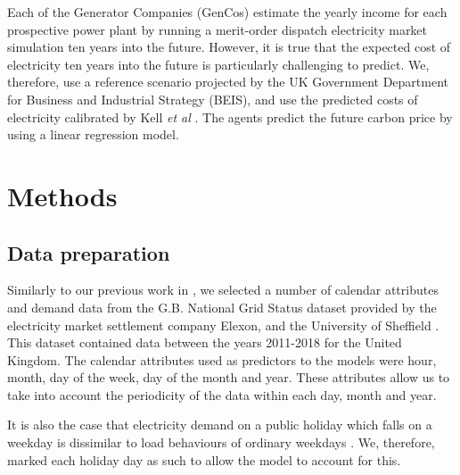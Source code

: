 \documentclass[final,3p,times,twocolumn,numbers]{elsarticle}
\begin{document}
Each of the Generator Companies (GenCos) estimate the yearly income for each prospective power plant by running a merit-order dispatch electricity market simulation ten years into the future. However, it is true that the expected cost of electricity ten years into the future is particularly challenging to predict. We, therefore, use a reference scenario projected by the UK Government Department for Business and Industrial Strategy (BEIS), and use the predicted costs of electricity calibrated by Kell \textit{et al} \cite{Kell2020, DBEIS2019}. The agents predict the future carbon price by using a linear regression model.


 
\section{Methods}
\label{sec:methods}


\subsection{Data preparation}

Similarly to our previous work in \cite{Kell2018a}, we selected a number of calendar attributes and demand data from the G.B. National Grid Status dataset provided by the electricity market settlement company Elexon, and the University of Sheffield \cite{gbnationalgridstatus_2019}. This dataset contained data between the years 2011-2018 for the United Kingdom. The calendar attributes used as predictors to the models were hour, month, day of the week, day of the month and year. These attributes allow us to take into account the periodicity of the data within each day, month and year.

It is also the case that electricity demand on a public holiday which falls on a weekday is dissimilar to load behaviours of ordinary weekdays \cite{Kim2000}. We, therefore, marked each holiday day as such to allow the model to account for this.
\end{document}
